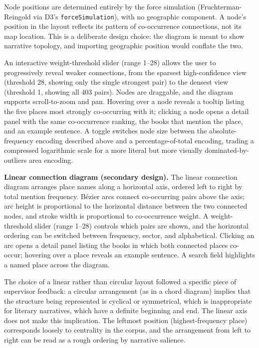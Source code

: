 \documentclass[logo,msc]{infthesis}
\begin{document}
Node positions are determined entirely by the force simulation (Fruchterman-Reingold via D3's \texttt{forceSimulation}), with no geographic component. A node's position in the layout reflects its pattern of co-occurrence connections, not its map location. This is a deliberate design choice: the diagram is meant to show narrative topology, and importing geographic position would conflate the two.
 
An interactive weight-threshold slider (range 1--28) allows the user to progressively reveal weaker connections, from the sparsest high-confidence view (threshold 28, showing only the single strongest pair) to the densest view (threshold 1, showing all 403 pairs). Nodes are draggable, and the diagram supports scroll-to-zoom and pan. Hovering over a node reveals a tooltip listing the five places most strongly co-occurring with it; clicking a node opens a detail panel with the same co-occurrence ranking, the books that mention the place, and an example sentence. A toggle switches node size between the absolute-frequency encoding described above and a percentage-of-total encoding, trading a compressed logarithmic scale for a more literal but more visually dominated-by-outliers area encoding.
 
\textbf{Linear connection diagram (secondary design).} The linear connection diagram arranges place names along a horizontal axis, ordered left to right by total mention frequency. Bézier arcs connect co-occurring pairs above the axis; arc height is proportional to the horizontal distance between the two connected nodes, and stroke width is proportional to co-occurrence weight. A weight-threshold slider (range 1--28) controls which pairs are shown, and the horizontal ordering can be switched between frequency, sector, and alphabetical. Clicking an arc opens a detail panel listing the books in which both connected places co-occur; hovering over a place reveals an example sentence. A search field highlights a named place across the diagram.
 
The choice of a linear rather than circular layout followed a specific piece of supervisor feedback: a circular arrangement (as in a chord diagram) implies that the structure being represented is cyclical or symmetrical, which is inappropriate for literary narratives, which have a definite beginning and end. The linear axis does not make this implication. The leftmost position (highest-frequency place) corresponds loosely to centrality in the corpus, and the arrangement from left to right can be read as a rough ordering by narrative salience.
\end{document}
